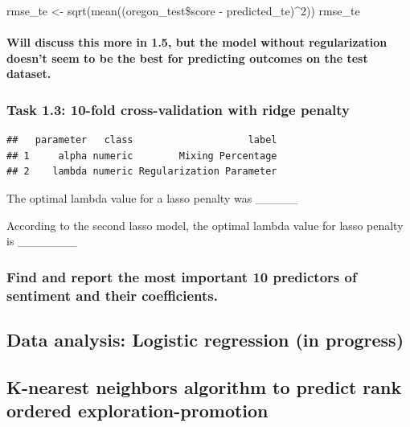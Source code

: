 \documentclass[
  english,
  man]{apa6}
\let\oldparagraph\paragraph
\renewcommand{\paragraph}[1]{\oldparagraph{#1}\mbox{}}
\begin{document}
rmse\_te \textless- sqrt(mean((oregon\_test\$score - predicted\_te)\^{}2))
rmse\_te

\hypertarget{will-discuss-this-more-in-1.5-but-the-model-without-regularization-doesnt-seem-to-be-the-best-for-predicting-outcomes-on-the-test-dataset.}{%
\paragraph{Will discuss this more in 1.5, but the model without regularization doesn't seem to be the best for predicting outcomes on the test dataset.}\label{will-discuss-this-more-in-1.5-but-the-model-without-regularization-doesnt-seem-to-be-the-best-for-predicting-outcomes-on-the-test-dataset.}}

\hypertarget{task-1.3-10-fold-cross-validation-with-ridge-penalty}{%
\subsubsection{Task 1.3: 10-fold cross-validation with ridge penalty}\label{task-1.3-10-fold-cross-validation-with-ridge-penalty}}

\begin{verbatim}
##   parameter   class                    label
## 1     alpha numeric        Mixing Percentage
## 2    lambda numeric Regularization Parameter
\end{verbatim}

The optimal lambda value for a lasso penalty was \_\_\_\_\_

According to the second lasso model, the optimal lambda value for lasso penalty is \_\_\_\_\_\_\_

\hypertarget{find-and-report-the-most-important-10-predictors-of-sentiment-and-their-coefficients.}{%
\subsubsection{Find and report the most important 10 predictors of sentiment and their coefficients.}\label{find-and-report-the-most-important-10-predictors-of-sentiment-and-their-coefficients.}}

\hypertarget{data-analysis-logistic-regression-in-progress}{%
\subsection{Data analysis: Logistic regression (in progress)}\label{data-analysis-logistic-regression-in-progress}}

\hypertarget{k-nearest-neighbors-algorithm-to-predict-rank-ordered-exploration-promotion}{%
\subsection{K-nearest neighbors algorithm to predict rank ordered exploration-promotion}\label{k-nearest-neighbors-algorithm-to-predict-rank-ordered-exploration-promotion}}
\end{document}
